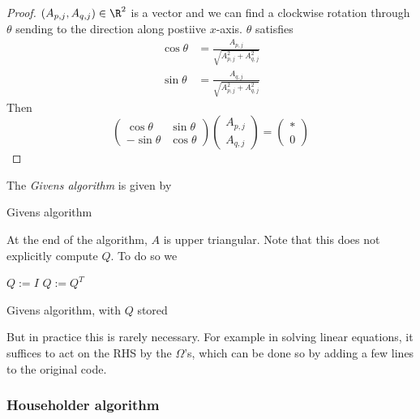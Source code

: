 \documentclass[a4paper]{article}
\begin{document}
\begin{proof}
  \((A_{p, j}, A_{q, j}) \in \R^2\) is a vector and we can find a clockwise rotation through \(\theta\) sending to the direction along postiive \(x\)-axis. \(\theta\) satisfies
  \begin{align*}
    \cos \theta &= \frac{A_{p,j}}{\sqrt{A_{p, j}^2 + A_{q, j}^2}} \\
    \sin \theta &= \frac{A_{q,j}}{\sqrt{A_{p, j}^2 + A_{q, j}^2}}
  \end{align*}
  Then
  \[
    \begin{pmatrix}
      \cos \theta & \sin \theta \\
      -\sin \theta & \cos \theta
    \end{pmatrix}
    \begin{pmatrix}
      A_{p, j} \\
      A_{q, j}
    \end{pmatrix}
    =
    \begin{pmatrix}
      \ast \\
      0
    \end{pmatrix}
  \]
\end{proof}

The \emph{Givens algorithm} is given by

\begin{algorithm}
  \caption{Givens algorithm}
\end{algorithm}

At the end of the algorithm, \(A\) is upper triangular. Note that this does not explicitly compute \(Q\). To do so we 

\begin{algorithm}
  \(Q := I\)\;
  \(Q := Q^T\)\;
  \caption{Givens algorithm, with \(Q\) stored}
\end{algorithm}

But in practice this is rarely necessary. For example in solving linear equations, it suffices to act on the RHS by the \(\Omega\)'s, which can be done so by adding a few lines to the original code.

\subsubsection{Householder algorithm}
\end{document}
